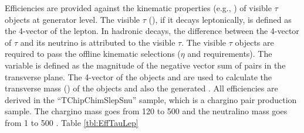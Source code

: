 Efficiencies are provided against the kinematic properties (e.g., \pt) of visible $\tau$ objects at generator level. The visible $\tau$ (\visTau), if it decays leptonically, is defined as the 4-vector of the lepton. In hadronic decays, the difference between the 4-vector of $\tau$ and its neutrino is attributed to the visible $\tau$. %
The visible $\tau$ objects are required to pass the offline kinematic selections ($\eta$ and \pt requirements). The \genMET variable is defined as the magnitude of the negative vector sum of \visTau pairs in the transverse plane. The 4-vector of the \visTau objects and \genMET are used to calculate the transverse mass (\mt) of the \visTau objects and also the generated \mttwo. All efficiencies are derived in the 
``TChipChimSlepSnu'' sample, which is a chargino pair production sample. The chargino mass goes from 120 to 500 \GeV and the neutralino mass goes from 
1 to 500 \GeV.
Table \ref{tbl:EffTauLep}
